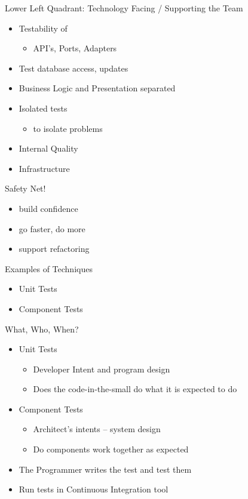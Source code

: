 \documentclass[10pt,t,a4paper]{beamer}
\begin{document}
\begin{frame}[shrink=15,label=sec-2]{Lower Left Quadrant: Technology Facing / Supporting the Team}
\begin{itemize}
\item Testability of
\begin{itemize}
\item API's,  Ports, Adapters
\end{itemize}
\item Test database access, updates
\item Business Logic and Presentation separated
\item Isolated tests
\begin{itemize}
\item to isolate problems
\end{itemize}
\item Internal Quality
\item Infrastructure
\end{itemize}

Safety Net!
\begin{itemize}
\item build confidence
\item go faster, do more
\item support refactoring
\end{itemize}
\begin{block}{Examples of Techniques}
\begin{itemize}
\item Unit Tests
\item Component Tests
\end{itemize}
\end{block}
\end{frame}
\begin{frame}[label=sec-3]{What, Who, When?}
\begin{itemize}
\item Unit Tests
\begin{itemize}
\item Developer Intent and program design
\item Does the code-in-the-small do what it is expected to do
\end{itemize}
\item Component Tests
\begin{itemize}
\item Architect's intents -- system design
\item Do components work together as expected
\end{itemize}
\item The \alert{Programmer} writes the test and test them
\item Run tests in Continuous Integration tool
\end{itemize}
\end{frame}
\end{document}
